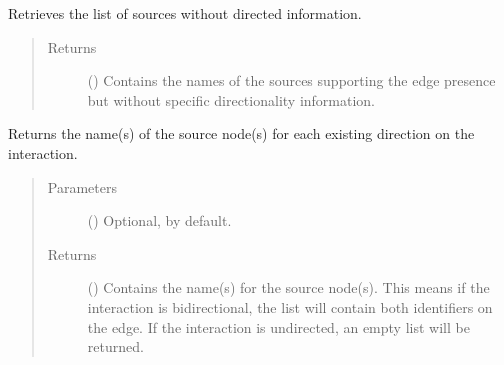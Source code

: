 \documentclass[letterpaper,10pt,english]{sphinxmanual}
\begin{document}
\begin{fulllineitems}
\begin{fulllineitems}
\begin{quote}
\begin{description}
\end{description}\end{quote}

\end{fulllineitems}


\begin{fulllineitems}
\label{\detokenize{main:pypath.main.Direction.sources_undirected}}
Retrieves the list of sources without directed information.
\begin{quote}\begin{description}
\item[{Returns}] \leavevmode
() \textendash{} Contains the names of the sources supporting the
edge presence but without specific directionality
information.

\end{description}\end{quote}

\end{fulllineitems}


\begin{fulllineitems}
\label{\detokenize{main:pypath.main.Direction.src}}
Returns the name(s) of the source node(s) for each existing
direction on the interaction.
\begin{quote}\begin{description}
\item[{Parameters}] \leavevmode
{} () \textendash{} Optional,  by default.

\item[{Returns}] \leavevmode
() \textendash{} Contains the name(s) for the source node(s).
This means if the interaction is bidirectional, the list
will contain both identifiers on the edge. If the
interaction is undirected, an empty list will be returned.

\end{description}\end{quote}

\end{fulllineitems}


\end{fulllineitems}
\end{document}

